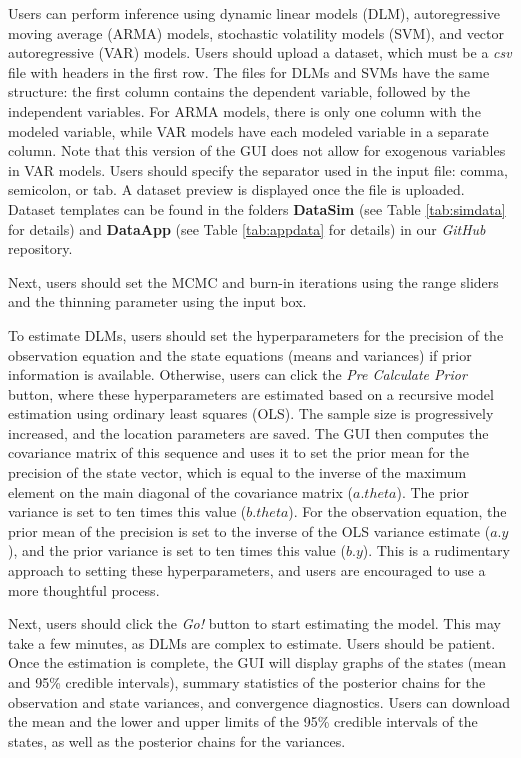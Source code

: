 Users can perform inference using dynamic linear models (DLM), autoregressive moving average (ARMA) models, stochastic volatility models (SVM), and vector autoregressive (VAR) models. Users should upload a dataset, which must be a \textit{csv} file with headers in the first row. The files for DLMs and SVMs have the same structure: the first column contains the dependent variable, followed by the independent variables. For ARMA models, there is only one column with the modeled variable, while VAR models have each modeled variable in a separate column. Note that this version of the GUI does not allow for exogenous variables in VAR models. Users should specify the separator used in the input file: comma, semicolon, or tab. A dataset preview is displayed once the file is uploaded. Dataset templates can be found in the folders \textbf{DataSim} (see Table \ref{tab:simdata} for details) and \textbf{DataApp} (see Table \ref{tab:appdata} for details) in our \textit{GitHub} repository.

Next, users should set the MCMC and burn-in iterations using the range sliders and the thinning parameter using the input box.

To estimate DLMs, users should set the hyperparameters for the precision of the observation equation and the state equations (means and variances) if prior information is available. Otherwise, users can click the \textit{Pre Calculate Prior} button, where these hyperparameters are estimated based on a recursive model estimation using ordinary least squares (OLS). The sample size is progressively increased, and the location parameters are saved. The GUI then computes the covariance matrix of this sequence and uses it to set the prior mean for the precision of the state vector, which is equal to the inverse of the maximum element on the main diagonal of the covariance matrix ($a.theta$). The prior variance is set to ten times this value ($b.theta$). For the observation equation, the prior mean of the precision is set to the inverse of the OLS variance estimate ($a.y$), and the prior variance is set to ten times this value ($b.y$). This is a rudimentary approach to setting these hyperparameters, and users are encouraged to use a more thoughtful process.

Next, users should click the \textit{Go!} button to start estimating the model. This may take a few minutes, as DLMs are complex to estimate. Users should be patient. Once the estimation is complete, the GUI will display graphs of the states (mean and 95\% credible intervals), summary statistics of the posterior chains for the observation and state variances, and convergence diagnostics. Users can download the mean and the lower and upper limits of the 95\% credible intervals of the states, as well as the posterior chains for the variances.

